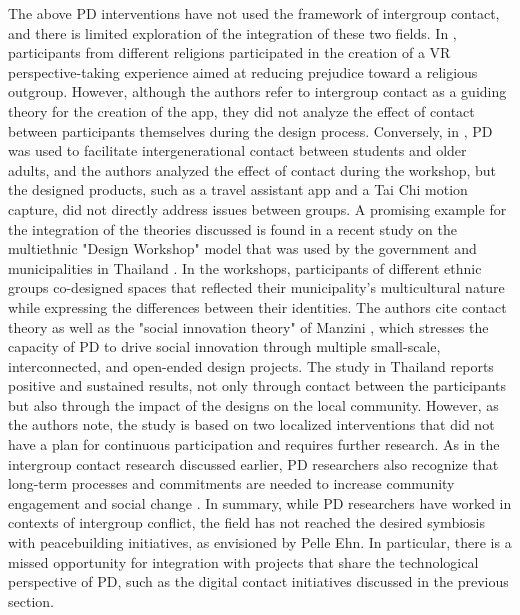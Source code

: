 \documentclass[dissertation,math,vertlayout,pdfa,colorlinks]{aaltoseries}
\begin{document}
The above PD interventions have not used the framework of intergroup contact, and there is limited exploration of the integration of these two fields. In \cite{rifatCohabitantDesignImplementation2024}, participants from different religions participated in the creation of a VR perspective-taking experience aimed at reducing prejudice toward a religious outgroup. However, although the authors refer to intergroup contact as a guiding theory for the creation of the app, they did not analyze the effect of contact between participants themselves during the design process. Conversely, in \cite{cheungEliminatingAgeismHigher2023}, PD was used to facilitate intergenerational contact between students and older adults, and the authors analyzed the effect of contact during the workshop, but the designed products, such as a travel assistant app and a Tai Chi motion capture, did not directly address issues between groups. A promising example for the integration of the theories discussed is found in a recent study on the multiethnic "Design Workshop" model that was used by the government and municipalities in Thailand \cite{wangThailandsDesignWorkshop2024}. In the workshops, participants of different ethnic groups co-designed spaces that reflected their municipality's multicultural nature while expressing the differences between their identities. The authors cite contact theory as well as the "social innovation theory" of Manzini \cite{manziniDesignWhenEverybody2015}, which stresses the capacity of PD to drive social innovation through multiple small-scale, interconnected, and open-ended design projects. The study in Thailand reports positive and sustained results, not only through contact between the participants but also through the impact of the designs on the local community. However, as the authors note, the study is based on two localized interventions that did not have a plan for continuous participation and requires further research. As in the intergroup contact research discussed earlier, PD researchers also recognize that long-term processes and commitments are needed to increase community engagement and social change \cite{saad-sulonenUnfoldingParticipationTime2018a}. In summary, while PD researchers have worked in contexts of intergroup conflict, the field has not reached the desired symbiosis with peacebuilding initiatives, as envisioned by Pelle Ehn. In particular, there is a missed opportunity for integration with projects that share the technological perspective of PD, such as the digital contact initiatives discussed in the previous section.
\end{document}
